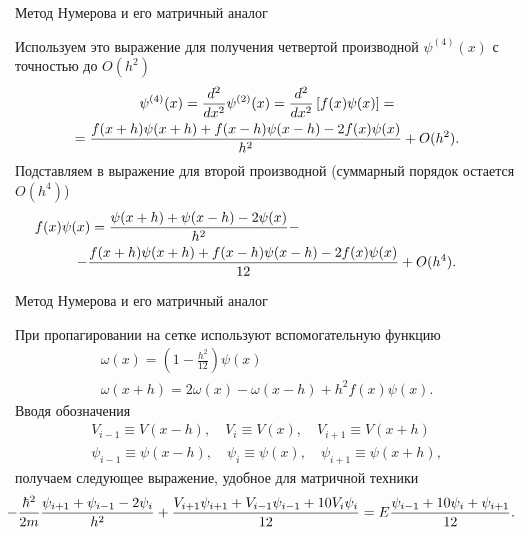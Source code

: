 \documentclass[10pt,pdf,hyperref={unicode},xcolor=dvipsnames]{beamer}
\newcommand{\lb}{\left(}
\newcommand{\rb}{\right)}
\newcommand{\lsq}{\left[}
\newcommand{\rsq}{\right]}
\newcommand{\psip}[1]{\psi^{(#1)}(x)}
\newcommand{\fx}[0]{f(x)}
\newcommand{\psix}[0]{\psi(x)}
\begin{document}
\begin{frame}{Метод Нумерова и его матричный аналог}
    \begin{block}{}
        Используем это выражение для получения четвертой производной $\psip{4}$ с точностью до $O(h^2)$
        \begin{gather}
            \psip{4} = \frac{d^2}{dx^2} \psip{2} = \frac{d^2}{dx^2} \lsq \fx \psix \rsq = \notag \\
                     = \frac{ f(x+h)\psi(x+h) + f(x-h)\psi(x-h) - 2f(x)\psi(x) }{ h^2 } + O(h^2). 
        \end{gather}
        Подставляем в выражение для второй производной (суммарный порядок остается $O(h^4)$)
        \begin{gather}
            \fx \psix = \frac{\psi(x+h)+\psi(x-h)-2\psi(x)}{h^2} - \hspace{5cm} \notag \\ 
            - \frac{f(x+h) \psi(x+h) + f(x-h) \psi(x-h) - 2f(x) \psi(x)}{12} + O(h^4).
        \end{gather}
    \end{block}
\end{frame}

\begin{frame}{Метод Нумерова и его матричный аналог}
    \begin{block}{}
        При пропагировании на сетке используют вспомогательную функцию 
        \begin{gather}
            \omega(x) =  \lb 1 - \frac{h^2}{12} \rb \psi(x) \\
            \omega(x + h) = 2\omega(x) - \omega(x-h) + h^2 f(x) \psi(x).
        \end{gather}
        Вводя обозначения
        \begin{gather}
            V_{i-1} \equiv V(x-h), \quad V_i \equiv V(x), \quad V_{i+1} \equiv V(x + h) \\
            \psi_{i - 1} \equiv \psi(x-h), \quad \psi_i \equiv \psi(x), \quad \psi_{i+1} \equiv \psi(x+h),
        \end{gather}
        получаем следующее выражение, удобное для матричной техники 
        \begin{gather}
            \hspace*{-0.3cm}
            -\frac{\hbar^2}{2 m} \frac{\psi_{i+1} + \psi_{i-1} - 2 \psi_i}{h^2} + \frac{V_{i+1} \psi_{i+1} + V_{i-1}\psi_{i-1}+10 V_i \psi_i}{12} = E \frac{\psi_{i-1} + 10 \psi_i + \psi_{i+1}}{12}. \notag 
        \end{gather}
    \end{block}
\end{frame}
\end{document}
